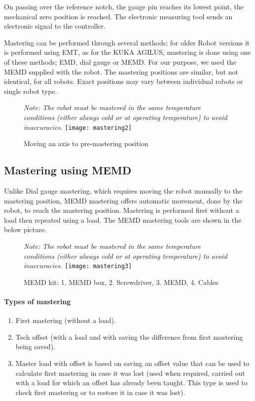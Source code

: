 	On passing over the reference notch, the gauge pin reaches its lowest point, the mechanical zero position is reached. The electronic measuring tool sends an electronic signal to the controller.
	
	Mastering can be performed through several methods; for older Robot versions it is performed using EMT, as for the KUKA AGILUS, mastering is done using one of these methods; EMD, dial gauge or MEMD. For our purpose, we used the MEMD supplied with the robot. The mastering positions are similar, but not identical, for all robots. Exact positions may vary between individual robots or single robot type. 
	\begin{figure}[H]
        \centering
        \textit{Note: The robot must be mastered in the same temperature conditions (either always cold or at operating temperature) to avoid inaccuracies.}
		\texttt{[image: mastering2]}
		\caption{Moving an axis to pre-mastering position}
    \end{figure}
	
		\subsection{Mastering using MEMD}
		Unlike Dial gauge mastering, which requires moving the robot manually to the mastering position, MEMD mastering offers automatic movement, done by the robot, to reach the mastering position. Mastering is performed first without a load then repeated using a load. The MEMD mastering tools are shown in the below picture.
			\begin{figure}[H]
            \centering
            \textit{Note: The robot must be mastered in the same temperature conditions (either always cold or at operating temperature) to avoid inaccuracies.}
			\texttt{[image: mastering3]}
			\caption{MEMD kit: 1. MEMD box, 2. Screwdriver, 3. MEMD, 4. Cables}
        \end{figure}
    
		\paragraph{Types of mastering}
		\begin{enumerate}
			\item First mastering (without a load).
			\item Tech offset (with a load and with saving the difference from first mastering being saved).
			\item Master load with offset is based on saving an offset value that can be used to calculate first mastering in case it was lost (used when required, carried out with a load for which an offset has already been taught. This type is used to check first mastering or to restore it in case it was lost).
		\end{enumerate}
		
